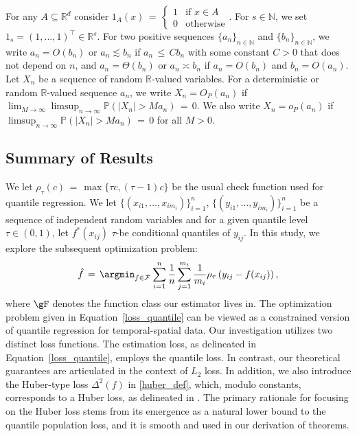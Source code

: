\documentclass[twoside,11pt]{article}
\begin{document}
For any $A \subseteq \mathbb{R}^d$ consider $1_A(x) \,=\, \begin{cases} 1 & \text{if } x \in A \\ 0 & \text{otherwise} \end{cases}$. For $s \in \mathbb{N}$, we set $1_s = (1, . . . ,1)^{\top} \in \mathbb{R}^s$. For two positive sequences $\{a_n\}_{n\in\mathbb{N}}$ and $\{b_n\}_{n\in\mathbb{N}}$, we write $a_n = O(b_n)$ or $a_n \lesssim b_n$ if $a_n \,\leq\, Cb_n$ with some constant $C > 0$ that does not depend on $n$, and $a_n = \Theta(b_n)$ or $a_n \asymp b_n$ if $a_n = O(b_n)$ and $b_n = O(a_n)$. Let $X_n$ be a sequence of random $\mathbb{R}$-valued variables. For a deterministic or random $\mathbb{R}$-valued sequence $a_n$, we write $X_n = O_P(a_n)$ if $\lim_{M\to\infty} \limsup_{n\to\infty} \mathbb{P}(|X_n| > Ma_n) \,=\, 0$. We also write $X_n = o_P(a_n)$ if $\limsup_{n\to\infty} \mathbb{P}(|X_n| > M a_n) \,=\, 0$ for all $M > 0$.






\subsection{Summary of Results}
 We let $ \rho_\tau (c) \,=\, \max\{\tau c, (\tau-1)c\} $ be the usual check function used for quantile regression. We let $\{ (x_{i1}, \dots, x_{im_i}) \}^{n}_{i=1}$, $\{ (y_{i1}, \dots, y_{im_i}) \}^{n}_{i=1}$ be a sequence of independent random variables and for a given quantile level $\tau \in (0, 1) $, let $f^{*}(x_{ij}) $ $\tau $-be conditional quantiles of $y_{ij}$.  In this study, we explore the subsequent optimization problem:
\begin{align}
\label{loss_quantile}
\hat f \,=\, \argmin_{f \in \mathcal{F}} \sum_{i=1}^{n} \frac{1}{n}\sum_{j=1}^{m_i} \frac{1}{m_i} \rho_\tau\left( y_{ij} - f(x_{ij}) \right),
\end{align}
where $\gF$ denotes the function class our estimator lives in. 
The optimization problem given in Equation~\eqref{loss_quantile} can be viewed as
a constrained version of quantile regression for temporal-spatial data.
Our investigation utilizes two distinct loss functions. The estimation loss, as delineated in Equation~\eqref{loss_quantile}, employs the quantile loss. In contrast, our theoretical guarantees are articulated in the context of $L_2$ loss. In addition, we also introduce the Huber-type loss $\Delta^2(f)$ in \eqref{huber_def}, 
which, modulo constants, corresponds to a Huber loss, as delineated in \cite{huber1992robust}. The primary rationale for focusing on the Huber loss stems from its emergence as a natural lower bound to the quantile population loss, and it is smooth and used in our derivation of theorems.
\end{document}
